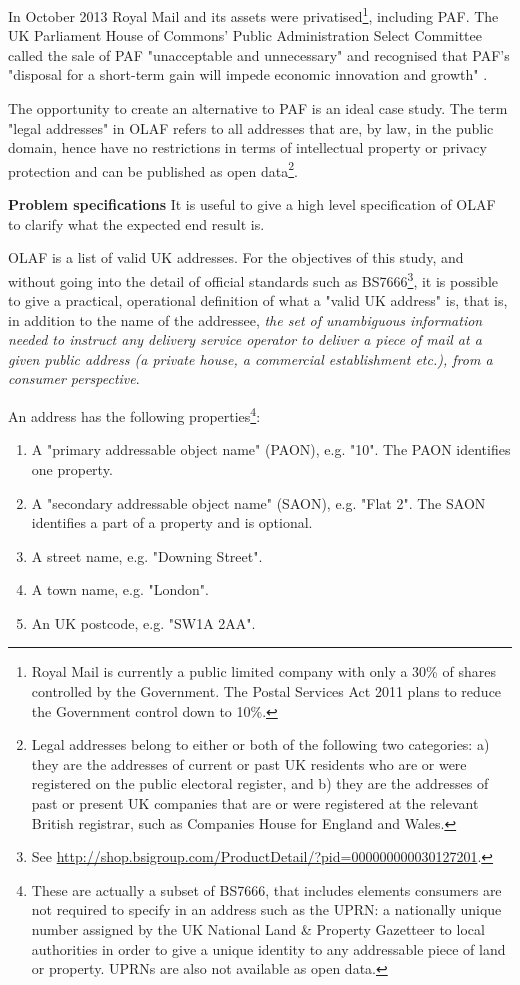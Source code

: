In October 2013 Royal Mail and its assets were privatised\footnote{Royal Mail is currently a public limited company with only a 30\% of shares controlled by the Government. The Postal Services Act 2011 \cite{postalserviceact2011} plans to reduce the Government control down to 10\%.}, including PAF. The UK Parliament House of Commons' Public Administration Select Committee called the sale of PAF "unacceptable and unnecessary" and recognised that PAF's "disposal for a short-term gain will impede economic innovation and growth" \cite{pascod}.

The opportunity to create an alternative to PAF is an ideal case study. The term "legal addresses" in OLAF refers to all addresses that are, by law, in the public domain, hence have no restrictions in terms of intellectual property or privacy protection and can be published as open data\footnote{Legal addresses belong to either or both of the following two categories: a) they are the addresses of current or past UK residents who are or were registered on the public electoral register, and b) they are the addresses of past or present UK companies that are or were registered at the relevant British registrar, such as Companies House for England and Wales.}.

\textbf{Problem specifications} It is useful to give a high level specification of OLAF to clarify what the expected end result is. 

OLAF is a list of valid UK addresses. For the objectives of this study, and without going into the detail of official standards such as BS7666\footnote{See \url{http://shop.bsigroup.com/ProductDetail/?pid=000000000030127201}.}, it is possible to give a practical, operational definition of what a "valid UK address" is, that is, in addition to the name of the addressee, {\it the set of unambiguous information needed to instruct any delivery service operator to deliver a piece of mail at a given public address (a private house, a commercial establishment etc.), from a consumer perspective}. 

An address has the following properties\footnote{These are actually a subset of BS7666, that includes elements consumers are not required to specify in an address such as the UPRN: a nationally unique number assigned by the UK National Land \& Property Gazetteer to local authorities in order to give a unique identity to any addressable piece of land or property. UPRNs are also not available as open data.}:

\begin{enumerate}
    \item A "primary addressable object name" (PAON), e.g. "10". The PAON identifies one property.
    \item A "secondary addressable object name" (SAON), e.g. "Flat 2". The SAON identifies a part of a property and is optional.
    \item A street name, e.g. "Downing Street".
    \item A town name, e.g. "London".
    \item An UK postcode, e.g. "SW1A 2AA".
\end{enumerate}

